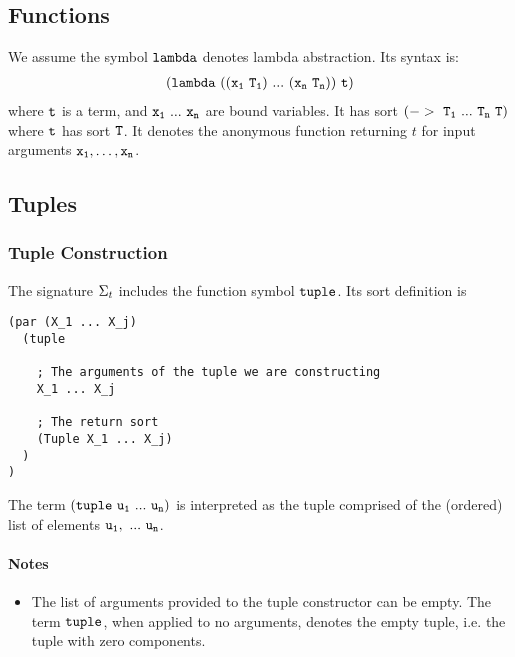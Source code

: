 \documentclass[english,a4paper,10pt]{article}
\begin{document}
\subsection{Functions}
We assume
the symbol ${\tt lambda}$ denotes lambda abstraction.
Its syntax is:
\begin{align*}
{\tt  
(lambda\ ((x_1\ T_1)\ ...\ (x_n\ T_n))\ t)
}
\end{align*}
where ${\tt t}$ is a term,
and ${\tt x_1\ ...\ x_n}$ are bound variables.
It has sort $\syntax{(->\ T_1\ ...\ T_n\ T)}$
where ${\tt t}$ has sort ${\tt T}$.
It denotes the anonymous function
returning $t$ for input arguments ${\tt x_1}, \ldots, {\tt x_n}$.

\subsection{Tuples}

\subsubsection{Tuple Construction}
The signature $\Sigma_{t}$ includes 
the function symbol ${\tt tuple}$.
Its sort definition is
\begin{verbatim}
(par (X_1 ... X_j) 
  (tuple
  
    ; The arguments of the tuple we are constructing
    X_1 ... X_j
    
    ; The return sort
    (Tuple X_1 ... X_j)
  )
)
\end{verbatim}
The term $\syntax{(tuple\ u_1\ ...\ u_n)}$ is
interpreted as the tuple comprised of 
the (ordered) list of elements $\syntax{u_1,\ ...\ u_n}$.
\paragraph{Notes}
\begin{itemize}
\item
The list of arguments provided to the tuple constructor can be empty.
The term ${\tt tuple}$, when applied to no arguments, denotes the empty tuple,
i.e. the tuple with zero components.
\end{itemize}
\end{document}
